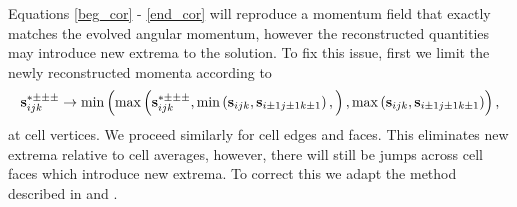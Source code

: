 \documentclass{aastex63}
\begin{document}
Equations \ref{beg_cor} - \ref{end_cor} will reproduce a momentum field that exactly matches the evolved angular momentum, however the reconstructed quantities may introduce new extrema to the solution. To fix this issue, first we limit the newly reconstructed momenta according to
\begin{equation}
\vect{s}^{* \pm\pm\pm}_{i j k} \rightarrow
\mathrm{min}\left(
\mathrm{max}\left(
\vect{s}^{* \pm\pm\pm}_{i j k},
\mathrm{min}\left(\vect{s}_{i j k}, \vect{s}_{i\pm 1 j \pm 1 k\pm 1}\right), 
\right), \mathrm{max}\left(\vect{s}_{i j k}, \vect{s}_{i\pm 1 j \pm 1 k\pm 1}\right) \right),
\end{equation}
at cell vertices. We proceed similarly for cell edges and faces.
This eliminates new extrema relative to cell averages, however, there will still be jumps across cell faces which introduce new extrema. To correct this we adapt the method described in \cite{Kurganov2001} and \cite{Liu1998}.


\end{document}
